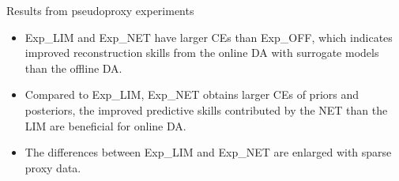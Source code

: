 \documentclass[final]{beamer}
\newlength{\colwidth}
\begin{document}
\begin{frame}[t]
\begin{columns}[t]
\begin{column}{\colwidth}
    			\begin{alertblock}{Results from pseudoproxy experiments}
                    \begin{itemize}            
                        \item Exp\_LIM and Exp\_NET have larger CEs than Exp\_OFF, which indicates improved reconstruction skills from the online DA with surrogate models than the offline DA.
                        \item  Compared to Exp\_LIM, Exp\_NET obtains larger CEs of priors and posteriors, the improved predictive skills contributed by the NET than the LIM are beneficial for online DA.
                        \item  The differences between Exp\_LIM and Exp\_NET are enlarged with sparse proxy data.
                    \end{itemize}
                    \begin{figure}
                        \begin{minipage}[t]{0.8\textwidth}
                            \centering
                            \begin{minipage}[t]{0.49\textwidth}

\end{minipage}
\end{minipage}
\end{figure}
\end{alertblock}
\end{column}
\end{columns}
\end{frame}
\end{document}
